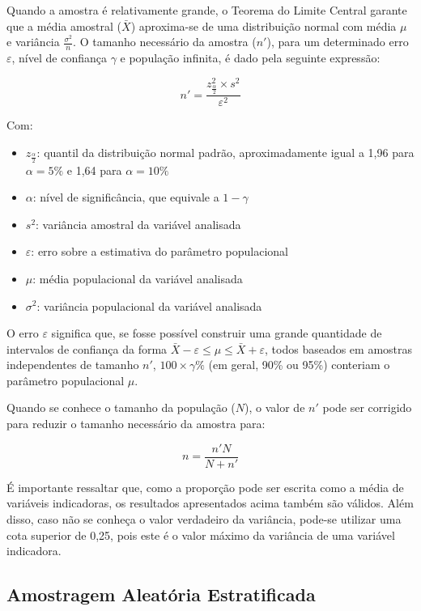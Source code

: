 \documentclass[
  portuguese,
]{estat/estat}
\providecommand{\tightlist}{%
  \setlength{\itemsep}{0pt}\setlength{\parskip}{0pt}}
\begin{document}
Quando a amostra é relativamente grande, o Teorema do Limite Central
garante que a média amostral (\(\bar{X}\)) aproxima-se de uma
distribuição normal com média \(\mu\) e variância
\(\frac{\sigma^2}{n}\). O tamanho necessário da amostra (\(n'\)), para
um determinado erro \(\varepsilon\), nível de confiança \(\gamma\) e
população infinita, é dado pela seguinte expressão:

\[
n' = \frac{z^2_{\frac{\alpha}{2}} \times s^2}{\varepsilon^2}
\]

Com:

\begin{itemize}
\tightlist
\item
  \(z_{\frac{\alpha}{2}}\): quantil da distribuição normal padrão,
  aproximadamente igual a 1,96 para \(\alpha = 5\%\) e 1,64 para
  \(\alpha = 10\%\)
\item
  \(\alpha\): nível de significância, que equivale a \(1 - \gamma\)
\item
  \(s^2\): variância amostral da variável analisada
\item
  \(\varepsilon\): erro sobre a estimativa do parâmetro populacional
\item
  \(\mu\): média populacional da variável analisada
\item
  \(\sigma^2\): variância populacional da variável analisada
\end{itemize}

O erro \(\varepsilon\) significa que, se fosse possível construir uma
grande quantidade de intervalos de confiança da forma
\(\bar{X} - \varepsilon \leq \mu \leq \bar{X} + \varepsilon\), todos
baseados em amostras independentes de tamanho \(n'\),
\(100 \times \gamma\%\) (em geral, 90\% ou 95\%) conteriam o parâmetro
populacional \(\mu\).

Quando se conhece o tamanho da população (\(N\)), o valor de \(n'\) pode
ser corrigido para reduzir o tamanho necessário da amostra para:

\[
n = \frac{n'N}{N+n'}
\]

É importante ressaltar que, como a proporção pode ser escrita como a
média de variáveis indicadoras, os resultados apresentados acima também
são válidos. Além disso, caso não se conheça o valor verdadeiro da
variância, pode-se utilizar uma cota superior de 0,25, pois este é o
valor máximo da variância de uma variável indicadora.

\subsection{Amostragem Aleatória
Estratificada}\label{amostragem-aleatuxf3ria-estratificada}
\end{document}
